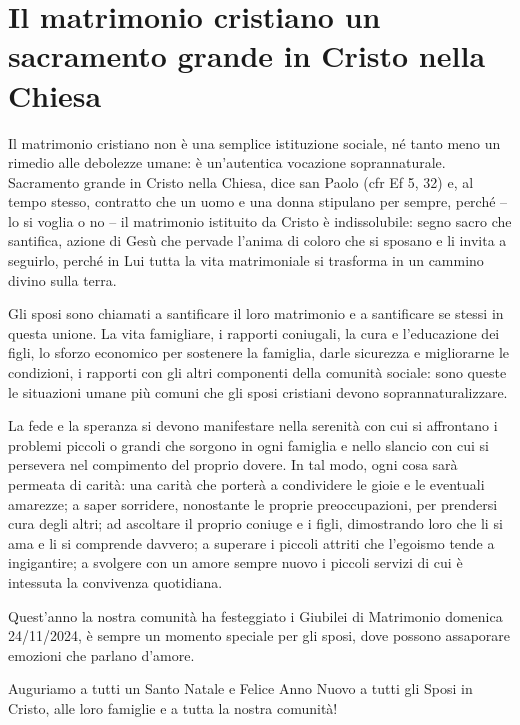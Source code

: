 \section{Il matrimonio cristiano un sacramento grande in Cristo nella Chiesa }

Il matrimonio cristiano non è una semplice istituzione sociale, né tanto meno un rimedio alle debolezze umane: è un'autentica vocazione soprannaturale. Sacramento grande in Cristo nella Chiesa, dice san Paolo (cfr Ef 5, 32) e, al tempo stesso, contratto che un uomo e una donna stipulano per sempre, perché -- lo si voglia o no -- il matrimonio istituito da Cristo è indissolubile: segno sacro che santifica, azione di Gesù che pervade l'anima di coloro che si sposano e li invita a seguirlo, perché in Lui tutta la vita matrimoniale si trasforma in un cammino divino sulla terra.

Gli sposi sono chiamati a santificare il loro matrimonio e a santificare se stessi in questa unione. La vita famigliare, i rapporti coniugali, la cura e l'educazione dei figli, lo sforzo economico per sostenere la famiglia, darle sicurezza e migliorarne le condizioni, i rapporti con gli altri componenti della comunità sociale: sono queste le situazioni umane più comuni che gli sposi cristiani devono soprannaturalizzare.

La fede e la speranza si devono manifestare nella serenità con cui si affrontano i problemi piccoli o grandi che sorgono in ogni famiglia e nello slancio con cui si persevera nel compimento del proprio dovere. In tal modo, ogni cosa sarà permeata di carità: una carità che porterà a condividere le gioie e le eventuali amarezze; a saper sorridere, nonostante le proprie preoccupazioni, per prendersi cura degli altri; ad ascoltare il proprio coniuge e i figli, dimostrando loro che li si ama e li si comprende davvero; a superare i piccoli attriti che l'egoismo tende a ingigantire; a svolgere con un amore sempre nuovo i piccoli servizi di cui è intessuta la convivenza quotidiana.

Quest’anno la nostra comunità ha festeggiato i Giubilei di Matrimonio domenica 24/11/2024, è sempre un momento speciale per gli sposi, dove possono assaporare emozioni che parlano d’amore.

Auguriamo a tutti un Santo Natale e Felice Anno Nuovo a tutti gli Sposi in Cristo, alle loro famiglie e a tutta la nostra comunità!


\clearpage

